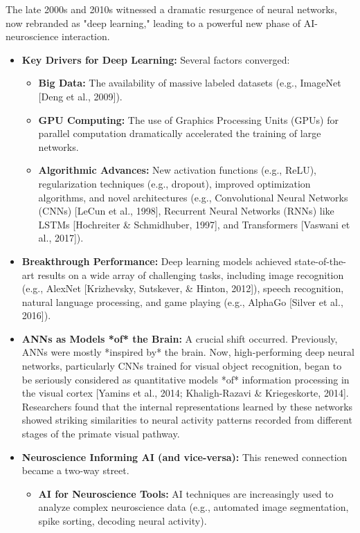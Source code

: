 \documentclass[11pt,a4paper]{article}
\begin{document}
The late 2000s and 2010s witnessed a dramatic resurgence of neural networks, now rebranded as "deep learning," leading to a powerful new phase of AI-neuroscience interaction.
\begin{itemize}
    \item \textbf{Key Drivers for Deep Learning:} Several factors converged:
        \begin{itemize}
            \item \textbf{Big Data:} The availability of massive labeled datasets (e.g., ImageNet [Deng et al., 2009]).
            \item \textbf{GPU Computing:} The use of Graphics Processing Units (GPUs) for parallel computation dramatically accelerated the training of large networks.
            \item \textbf{Algorithmic Advances:} New activation functions (e.g., ReLU), regularization techniques (e.g., dropout), improved optimization algorithms, and novel architectures (e.g., Convolutional Neural Networks (CNNs) [LeCun et al., 1998], Recurrent Neural Networks (RNNs) like LSTMs [Hochreiter \& Schmidhuber, 1997], and Transformers [Vaswani et al., 2017]).
        \end{itemize}
    \item \textbf{Breakthrough Performance:} Deep learning models achieved state-of-the-art results on a wide array of challenging tasks, including image recognition (e.g., AlexNet [Krizhevsky, Sutskever, \& Hinton, 2012]), speech recognition, natural language processing, and game playing (e.g., AlphaGo [Silver et al., 2016]).
    \item \textbf{ANNs as Models *of* the Brain:} A crucial shift occurred. Previously, ANNs were mostly *inspired by* the brain. Now, high-performing deep neural networks, particularly CNNs trained for visual object recognition, began to be seriously considered as quantitative models *of* information processing in the visual cortex [Yamins et al., 2014; Khaligh-Razavi \& Kriegeskorte, 2014]. Researchers found that the internal representations learned by these networks showed striking similarities to neural activity patterns recorded from different stages of the primate visual pathway.
    \item \textbf{Neuroscience Informing AI (and vice-versa):} This renewed connection became a two-way street.
        \begin{itemize}
            \item \textbf{AI for Neuroscience Tools:} AI techniques are increasingly used to analyze complex neuroscience data (e.g., automated image segmentation, spike sorting, decoding neural activity).

\end{itemize}
\end{itemize}
\end{document}
